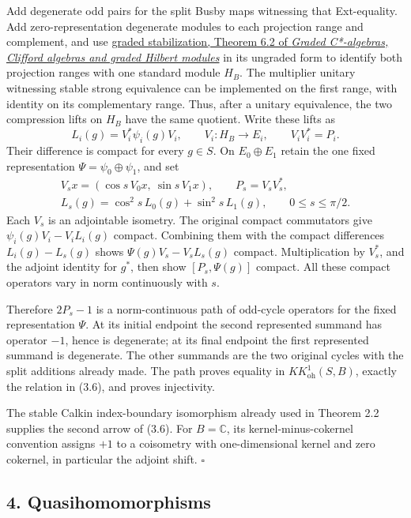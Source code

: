 \documentclass[
  11pt,
]{article}
\begin{document}
Add degenerate odd pairs for the split Busby maps witnessing that
Ext-equality. Add zero-representation degenerate modules to each
projection range and complement, and use
\href{KT-KK-05.html\#theorem-6-2-graded-stabilization}{graded
stabilization, Theorem 6.2 of \emph{Graded C*-algebras, Clifford
algebras and graded Hilbert modules}} in its ungraded form to identify
both projection ranges with one standard module \(H_B\). The multiplier
unitary witnessing stable strong equivalence can be implemented on the
first range, with identity on its complementary range. Thus, after a
unitary equivalence, the two compression lifts on \(H_B\) have the same
quotient. Write these lifts as \[
L_i(g)=V_i^*\psi_i(g)V_i,
\qquad V_i:H_B\longrightarrow E_i,
\qquad V_iV_i^*=P_i.
\] Their difference is compact for every \(g\in S\). On
\(E_0\oplus E_1\) retain the one fixed representation
\(\Psi=\psi_0\oplus\psi_1\), and set \[
\begin{gathered}
V_sx=(\cos s\,V_0x,\ \sin s\,V_1x),\qquad
P_s=V_sV_s^*,\\
L_s(g)=\cos^2s\,L_0(g)+\sin^2s\,L_1(g),
\qquad0\leq s\leq\pi/2.
\end{gathered}
\tag{3.9}
\] Each \(V_s\) is an adjointable isometry. The original compact
commutators give \(\psi_i(g)V_i-V_iL_i(g)\) compact. Combining them with
the compact differences \(L_i(g)-L_s(g)\) shows \(\Psi(g)V_s-V_sL_s(g)\)
compact. Multiplication by \(V_s^*\), and the adjoint identity for
\(g^*\), then show \([P_s,\Psi(g)]\) compact. All these compact
operators vary in norm continuously with \(s\).

Therefore \(2P_s-1\) is a norm-continuous path of odd-cycle operators
for the fixed representation \(\Psi\). At its initial endpoint the
second represented summand has operator \(-1\), hence is degenerate; at
its final endpoint the first represented summand is degenerate. The
other summands are the two original cycles with the split additions
already made. The path proves equality in \(KK^1_{\mathrm{oh}}(S,B)\),
exactly the relation in (3.6), and proves injectivity.

The stable Calkin index-boundary isomorphism already used in Theorem 2.2
supplies the second arrow of (3.6). For \(B=\mathbb C\), its
kernel-minus-cokernel convention assigns \(+1\) to a coisometry with
one-dimensional kernel and zero cokernel, in particular the adjoint
shift. \(\square\)

\subsection{4. Quasihomomorphisms}\label{quasihomomorphisms}
\end{document}
